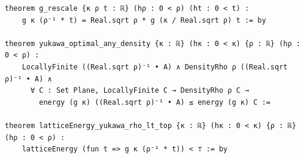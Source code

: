 \begin{Verbatim}[fontsize=\scriptsize,frame=single,framesep=1.5mm]
theorem g_rescale {κ ρ t : ℝ} (hρ : 0 < ρ) (ht : 0 < t) :
    g κ (ρ⁻¹ * t) = Real.sqrt ρ * g (κ / Real.sqrt ρ) t := by

theorem yukawa_optimal_any_density {κ : ℝ} (hκ : 0 < κ) {ρ : ℝ} (hρ : 0 < ρ) :
    LocallyFinite ((Real.sqrt ρ)⁻¹ • A) ∧ DensityRho ρ ((Real.sqrt ρ)⁻¹ • A) ∧
      ∀ C : Set Plane, LocallyFinite C → DensityRho ρ C →
        energy (g κ) ((Real.sqrt ρ)⁻¹ • A) ≤ energy (g κ) C :=

theorem latticeEnergy_yukawa_rho_lt_top {κ : ℝ} (hκ : 0 < κ) {ρ : ℝ} (hρ : 0 < ρ) :
    latticeEnergy (fun t => g κ (ρ⁻¹ * t)) < ⊤ := by
\end{Verbatim}
